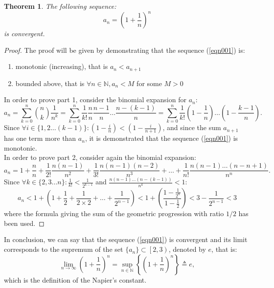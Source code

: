 \documentclass[12pt]{article}
\newtheorem{theorem}{Theorem}
\begin{document}
\begin{theorem}
The following sequence:
\begin{equation}
a_n=\left(1+\frac{1}{n}\right)^n
\label{eqn001}
\end{equation}
is convergent.
\end{theorem}
\begin{proof}
The proof will be given by demonstrating that the sequence (\ref{eqn001}) is:
\begin{enumerate}
\item monotonic (increasing), that is $a_{n}<a_{n+1}$
\item bounded above, that is $\forall n\in\mathbb{N}, a_n<M$ for some $M>0$
\end{enumerate}
In order to prove part 1, consider the binomial expansion for $a_n$:
$$
a_n=\sum_{k=0}^{n}\binom{n}{k}\frac{1}{n^k}=\sum_{k=0}^{n}\frac{1}{k!}\frac{n}{n}\frac{n-1}{n}\ldots\frac{n-(k-1)}{n}=\sum_{k=0}^{n}\frac{1}{k!}\left(1-\frac{1}{n}\right)\ldots\left(1-\frac{k-1}{n}\right).
$$
Since $\forall i\in\{1,2\ldots (k-1)\}:(1-\frac{i}{n})<(1-\frac{i}{n+1})$, and since the sum $a_{n+1}$ has one term more than $a_n$, it is demonstrated that the sequence (\ref{eqn001}) is monotonic.\\
In order to prove part 2, consider again the binomial expansion:
$$
a_n=1+\frac{n}{n}+\frac{1}{2!}\frac{n(n-1)}{n^2}+\frac{1}{3!}\frac{n(n-1)(n-2)}{n^3}+\ldots+\frac{1}{n!}\frac{n(n-1)\ldots(n-n+1)}{n^n}.
$$
Since $\forall k\in\{2,3\ldots n\}:\frac{1}{k!}<\frac{1}{2^{k-1}}$ and $\frac{n(n-1)\ldots(n-(k-1))}{n^k}<1$: 
$$
a_n<1+\left(1+\frac{1}{2}+\frac{1}{2\times2}+\ldots+\frac{1}{2^{n-1}}\right)<1+\left(\frac{1-\frac{1}{2^n}}{1-\frac{1}{2}}\right)<3-\frac{1}{2^{n-1}}<3
$$
where the formula giving the sum of the geometric progression with ratio $1/2$ has been used.
\end{proof}
\noindent In conclusion, we can say that the sequence (\ref{eqn001}) is convergent and its limit corresponds to the supremum of the set $\{a_n\}\subset\left[2,3\right)$, denoted by $e$, that is:
$$
\lim_{n\to\infty}\left(1+\frac{1}{n}\right)^n=\sup_{n\in\mathbb{N}}\left\{\left(1+\frac{1}{n}\right)^n\right\}\triangleq e,
$$
which is the definition of the Napier's constant.
\end{document}
